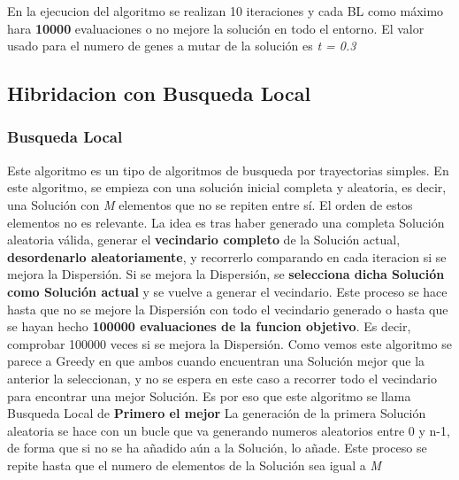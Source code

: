 \documentclass{article}
\begin{document}
En la ejecucion del algoritmo se realizan 10 iteraciones y cada BL como máximo hara \textbf{10000} evaluaciones 
o no mejore la solución en todo el entorno.
El valor usado para el numero de genes a mutar de la solución es \emph{t = 0.3}

\newpage
\subsection{\normalsize Hibridacion con Busqueda Local}
\subsubsection{\scriptsize Busqueda Local}
 Este algoritmo es un tipo de algoritmos de busqueda por trayectorias simples.
\newline En este algoritmo, se empieza con una solución inicial completa y aleatoria,
es decir, una Solución con \emph{M} elementos que no se repiten entre sí.
El orden de estos elementos no es relevante.
\vspace{5mm}
\newline La idea es tras haber generado una completa Solución aleatoria válida, generar el 
\textbf{vecindario completo} de la Solución actual, \textbf{desordenarlo aleatoriamente}, y recorrerlo 
comparando en cada iteracion si se mejora la Dispersión.
\newline Si se mejora la Dispersión, se \textbf{selecciona dicha Solución como Solución actual} y 
se vuelve a generar el vecindario. Este proceso se hace hasta que no se mejore la Dispersión con 
todo el vecindario generado o hasta que se hayan hecho \textbf{100000 evaluaciones de la funcion objetivo}.
Es decir, comprobar 100000 veces si se mejora la Dispersión.
\newline Como vemos este algoritmo se parece a Greedy en que ambos cuando encuentran una Solución 
mejor que la anterior la seleccionan, y no se espera en este caso a recorrer todo el vecindario para 
encontrar una mejor Solución. Es por eso que este algoritmo se llama Busqueda Local de \textbf{Primero el mejor}
\vspace{5mm}
\newline La generación de la primera Solución aleatoria se hace con un bucle que va generando 
numeros aleatorios entre 0 y n-1, de forma que si no se ha añadido aún a la Solución, lo añade.
Este proceso se repite hasta que el numero de elementos de la Solución sea igual a \emph{M}
\end{document}
